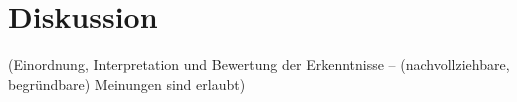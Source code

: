 \section{Diskussion}

(Einordnung, Interpretation und Bewertung der Erkenntnisse -- (nachvollziehbare, begründbare) Meinungen sind erlaubt)
